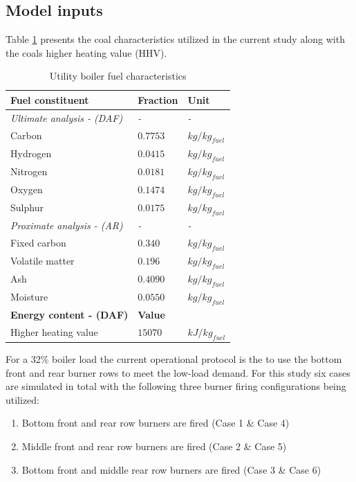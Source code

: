 \documentclass[review]{elsarticle}
\begin{document}
\subsection{Model inputs}
Table \ref{tbl_fuel} presents the coal characteristics utilized in the current study along with the coals higher heating value (HHV).\\
\begin{table}[h!]
\centering
\caption{Utility boiler fuel characteristics}
\vspace{5mm}
\label{tbl_fuel}
{\tabulinesep=1.2mm
\begin{tabularx}{\textwidth}{p{} p{} l}
\hline
\textbf{Fuel constituent} & \textbf{Fraction} & \textbf{Unit}\\
\hline
\textit{Ultimate analysis - (DAF)} & \textit{-} & \textit{-}\\
Carbon & $0.7753$ & $kg/kg_{fuel}$\\
Hydrogen & $0.0415$ & $kg/kg_{fuel}$\\
Nitrogen & $0.0181$ & $kg/kg_{fuel}$\\
Oxygen & $0.1474$ & $kg/kg_{fuel}$\\
Sulphur & $0.0175$ & $kg/kg_{fuel}$\\
\textit{Proximate analysis - (AR)} & \textit{-} & \textit{-}\\
Fixed carbon & $0.340$ & $kg/kg_{fuel}$\\
Volatile matter & $0.196$ & $kg/kg_{fuel}$\\
Ash & $0.4090$ & $kg/kg_{fuel}$\\
Moisture & $0.0550$ & $kg/kg_{fuel}$\\
\hline
\textbf{Energy content - (DAF)} & \textbf{Value} &\\
\hline
Higher heating value & $15070$ & $kJ/kg_{fuel}$\\
\hline
\end{tabularx}}
\end{table}

For a 32\% boiler load the current operational protocol is the to use the bottom front and rear burner rows to meet the low-load demand.  For this study six cases are simulated in total with the following three burner firing configurations being utilized:
\begin{enumerate}
\item Bottom front and rear row burners are fired (Case 1 \& Case 4)
\item Middle front and rear row burners are fired (Case 2 \& Case 5)
\item Bottom front and middle rear row burners are fired (Case 3 \& Case 6)
\end{enumerate}
\end{document}
